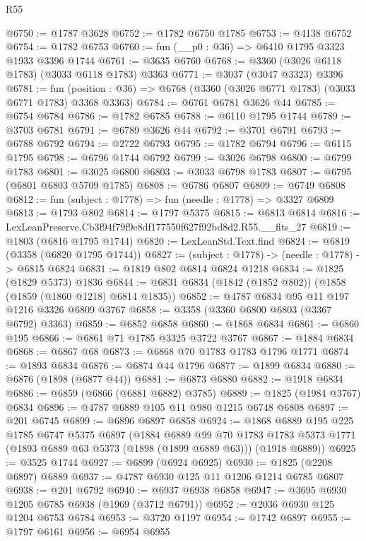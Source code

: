 \begin{lexlean}{R55}
\begin{coremodule}
@6750 := @1787 @3628
@6752 := @1782 @6750 @1785
@6753 := @4138 @6752
@6754 := @1782 @6753
@6760 := fun (__p0 : @36) => @6410 @1795 @3323 @1933 @3396 @1744
@6761 := @3635 @6760
@6768 := @3360 (@3026 @6118 @1783) (@3033 @6118 @1783) @3363
@6771 := @3037 (@3047 @3323) @3396
@6781 := fun (position : @36) => @6768 (@3360 (@3026 @6771 @1783) (@3033 @6771 @1783) @3368 @3363)
@6784 := @6761 @6781 @3626 @44
@6785 := @6754 @6784
@6786 := @1782 @6785
@6788 := @6110 @1795 @1744
@6789 := @3703 @6781
@6791 := @6789 @3626 @44
@6792 := @3701 @6791
@6793 := @6788 @6792
@6794 := @2722 @6793
@6795 := @1782 @6794
@6796 := @6115 @1795
@6798 := @6796 @1744 @6792
@6799 := @3026 @6798
@6800 := @6799 @1783
@6801 := @3025 @6800
@6803 := @3033 @6798 @1783
@6807 := @6795 (@6801 @6803 @5709 @1785)
@6808 := @6786 @6807
@6809 := @6749 @6808
@6812 := fun (subject : @1778) => fun (needle : @1778) => @3327 @6809
@6813 := @1793 @802
@6814 := @1797 @5375
@6815 := @6813 @6814
@6816 := LexLeanPreserve.Cb3f94f79f9e8df177550f627f92bd8d2.R55.__fits_27
@6819 := @1803 (@6816 @1795 @1744)
@6820 := LexLeanStd.Text.find
@6824 := @6819 (@3358 (@6820 @1795 @1744))
@6827 := (subject : @1778) -> (needle : @1778) -> @6815 @6824
@6831 := @1819 @802 @6814 @6824 @1218
@6834 := @1825 (@1829 @5373) @1836
@6844 := @6831 @6834 (@1842 (@1852 @802)) (@1858 (@1859 (@1860 @1218) @6814 @1835))
@6852 := @4787 @6834 @95 @11 @197 @1216 @3326 @6809 @3767
@6858 := @3358 (@3360 @6800 @6803 (@3367 @6792) @3363)
@6859 := @6852 @6858
@6860 := @1868 @6834
@6861 := @6860 @195
@6866 := @6861 @71 @1785 @3325 @3722 @3767
@6867 := @1884 @6834
@6868 := @6867 @68
@6873 := @6868 @70 @1783 @1783 @1796 @1771
@6874 := @1893 @6834
@6876 := @6874 @44 @1796
@6877 := @1899 @6834
@6880 := @6876 (@1898 (@6877 @44))
@6881 := @6873 @6880
@6882 := @1918 @6834
@6886 := @6859 (@6866 (@6881 @6882) @3785)
@6889 := @1825 (@1984 @3767) @6834
@6896 := @4787 @6889 @105 @11 @980 @1215 @6748 @6808
@6897 := @201 @6745
@6899 := @6896 @6897 @6858
@6924 := @1868
    @6889
    @195
    @225
    @1785
    @6747
    @5375
    @6897
    (@1884
      @6889
      @99
      @70
      @1783
      @1783
      @5373
      @1771
      (@1893 @6889 @63 @5373 (@1898 (@1899 @6889 @63)))
      (@1918 @6889))
@6925 := @3525 @1744
@6927 := @6899 (@6924 @6925)
@6930 := @1825 (@2208 @6897) @6889
@6937 := @4787 @6930 @125 @11 @1206 @1214 @6785 @6807
@6938 := @201 @6792
@6940 := @6937 @6938 @6858
@6947 := @3695 @6930 @1205 @6785 @6938 (@1969 (@3712 @6791))
@6952 := @2036 @6930 @125 @1204 @6753 @6784
@6953 := @3720 @1197
@6954 := @1742 @6897
@6955 := @1797 @6161
@6956 := @6954 @6955

\end{coremodule}
\end{lexlean}
